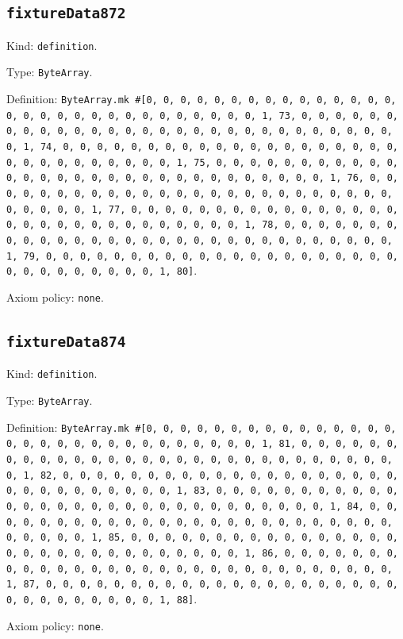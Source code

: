 \documentclass[11pt]{article}
\begin{document}
\subsection*{\texttt{fixtureData872}}
\noindent Kind: \texttt{definition}.\par
\noindent Type: \texttt{ByteArray}.\par
\noindent Definition: \texttt{ByteArray.mk \#[0, 0, 0, 0, 0, 0, 0, 0, 0, 0, 0, 0, 0, 0, 0, 0, 0, 0, 0, 0, 0, 0, 0, 0, 0, 0, 0, 0, 0, 0, 1, 73, 0, 0, 0, 0, 0, 0, 0, 0, 0, 0, 0, 0, 0, 0, 0, 0, 0, 0, 0, 0, 0, 0, 0, 0, 0, 0, 0, 0, 0, 0, 1, 74, 0, 0, 0, 0, 0, 0, 0, 0, 0, 0, 0, 0, 0, 0, 0, 0, 0, 0, 0, 0, 0, 0, 0, 0, 0, 0, 0, 0, 0, 0, 1, 75, 0, 0, 0, 0, 0, 0, 0, 0, 0, 0, 0, 0, 0, 0, 0, 0, 0, 0, 0, 0, 0, 0, 0, 0, 0, 0, 0, 0, 0, 0, 1, 76, 0, 0, 0, 0, 0, 0, 0, 0, 0, 0, 0, 0, 0, 0, 0, 0, 0, 0, 0, 0, 0, 0, 0, 0, 0, 0, 0, 0, 0, 0, 1, 77, 0, 0, 0, 0, 0, 0, 0, 0, 0, 0, 0, 0, 0, 0, 0, 0, 0, 0, 0, 0, 0, 0, 0, 0, 0, 0, 0, 0, 0, 0, 1, 78, 0, 0, 0, 0, 0, 0, 0, 0, 0, 0, 0, 0, 0, 0, 0, 0, 0, 0, 0, 0, 0, 0, 0, 0, 0, 0, 0, 0, 0, 0, 1, 79, 0, 0, 0, 0, 0, 0, 0, 0, 0, 0, 0, 0, 0, 0, 0, 0, 0, 0, 0, 0, 0, 0, 0, 0, 0, 0, 0, 0, 0, 0, 1, 80]}.\par
\noindent Axiom policy: \texttt{none}.\par
\subsection*{\texttt{fixtureData874}}
\noindent Kind: \texttt{definition}.\par
\noindent Type: \texttt{ByteArray}.\par
\noindent Definition: \texttt{ByteArray.mk \#[0, 0, 0, 0, 0, 0, 0, 0, 0, 0, 0, 0, 0, 0, 0, 0, 0, 0, 0, 0, 0, 0, 0, 0, 0, 0, 0, 0, 0, 0, 1, 81, 0, 0, 0, 0, 0, 0, 0, 0, 0, 0, 0, 0, 0, 0, 0, 0, 0, 0, 0, 0, 0, 0, 0, 0, 0, 0, 0, 0, 0, 0, 1, 82, 0, 0, 0, 0, 0, 0, 0, 0, 0, 0, 0, 0, 0, 0, 0, 0, 0, 0, 0, 0, 0, 0, 0, 0, 0, 0, 0, 0, 0, 0, 1, 83, 0, 0, 0, 0, 0, 0, 0, 0, 0, 0, 0, 0, 0, 0, 0, 0, 0, 0, 0, 0, 0, 0, 0, 0, 0, 0, 0, 0, 0, 0, 1, 84, 0, 0, 0, 0, 0, 0, 0, 0, 0, 0, 0, 0, 0, 0, 0, 0, 0, 0, 0, 0, 0, 0, 0, 0, 0, 0, 0, 0, 0, 0, 1, 85, 0, 0, 0, 0, 0, 0, 0, 0, 0, 0, 0, 0, 0, 0, 0, 0, 0, 0, 0, 0, 0, 0, 0, 0, 0, 0, 0, 0, 0, 0, 1, 86, 0, 0, 0, 0, 0, 0, 0, 0, 0, 0, 0, 0, 0, 0, 0, 0, 0, 0, 0, 0, 0, 0, 0, 0, 0, 0, 0, 0, 0, 0, 1, 87, 0, 0, 0, 0, 0, 0, 0, 0, 0, 0, 0, 0, 0, 0, 0, 0, 0, 0, 0, 0, 0, 0, 0, 0, 0, 0, 0, 0, 0, 0, 1, 88]}.\par
\noindent Axiom policy: \texttt{none}.\par
\end{document}
